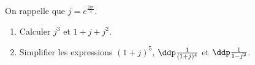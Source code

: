 
\begin{exercice} 
On rappelle que $j=e^{\frac{2i\pi}{3}}$.
\begin{enumerate}
\item Calculer $j^3$ et $1+j+j^2$.
\item Simplifier les expressions $(1+j)^5$, $\ddp\frac{1}{(1+j)^4}$ et $\ddp\frac{1}{1-j^2}$.
\end{enumerate}
\end{exercice}